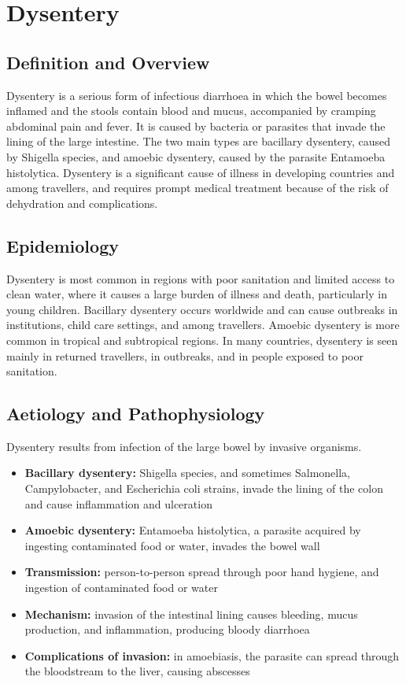 \chapter{Dysentery}

\section*{Definition and Overview}
Dysentery is a serious form of infectious diarrhoea in which the bowel becomes inflamed and the stools contain blood and mucus, accompanied by cramping abdominal pain and fever. It is caused by bacteria or parasites that invade the lining of the large intestine. The two main types are bacillary dysentery, caused by Shigella species, and amoebic dysentery, caused by the parasite Entamoeba histolytica. Dysentery is a significant cause of illness in developing countries and among travellers, and requires prompt medical treatment because of the risk of dehydration and complications.

\section*{Epidemiology}
Dysentery is most common in regions with poor sanitation and limited access to clean water, where it causes a large burden of illness and death, particularly in young children. Bacillary dysentery occurs worldwide and can cause outbreaks in institutions, child care settings, and among travellers. Amoebic dysentery is more common in tropical and subtropical regions. In many countries, dysentery is seen mainly in returned travellers, in outbreaks, and in people exposed to poor sanitation.

\section*{Aetiology and Pathophysiology}
Dysentery results from infection of the large bowel by invasive organisms.
\begin{itemize}
    \item \textbf{Bacillary dysentery:} Shigella species, and sometimes Salmonella, Campylobacter, and Escherichia coli strains, invade the lining of the colon and cause inflammation and ulceration
    \item \textbf{Amoebic dysentery:} Entamoeba histolytica, a parasite acquired by ingesting contaminated food or water, invades the bowel wall
    \item \textbf{Transmission:} person-to-person spread through poor hand hygiene, and ingestion of contaminated food or water
    \item \textbf{Mechanism:} invasion of the intestinal lining causes bleeding, mucus production, and inflammation, producing bloody diarrhoea
    \item \textbf{Complications of invasion:} in amoebiasis, the parasite can spread through the bloodstream to the liver, causing abscesses
\end{itemize}


